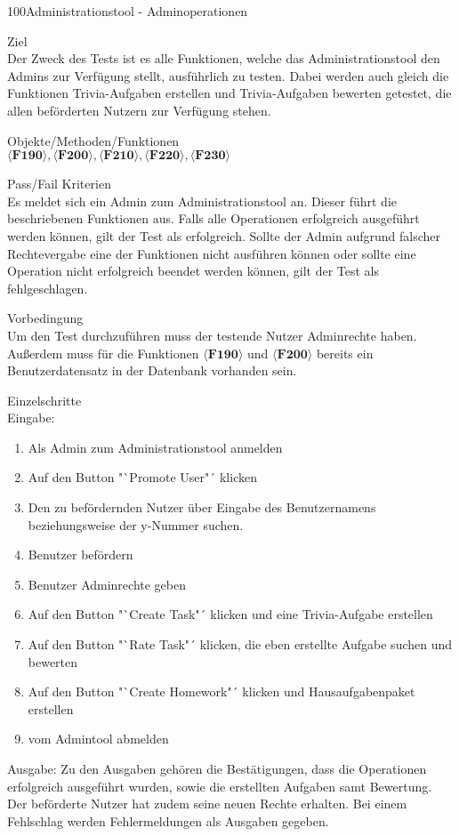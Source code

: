 \begin{testcase}{100}{Administrationstool - Adminoperationen}

\item[Ziel]~\\
Der Zweck des Tests ist es alle Funktionen, welche das Administrationstool den Admins zur Verfügung stellt, ausführlich zu testen. Dabei werden auch gleich die Funktionen Trivia-Aufgaben erstellen und Trivia-Aufgaben bewerten getestet, die allen beförderten Nutzern zur Verfügung stehen.

\item[Objekte/Methoden/Funktionen]~\\
$\langle\textbf{F190}\rangle, \langle\textbf{F200}\rangle, \langle\textbf{F210}\rangle, \langle\textbf{F220}\rangle, \langle\textbf{F230}\rangle$ 

\item[Pass/Fail Kriterien]~\\
Es meldet sich ein Admin zum Administrationstool an. Dieser führt die beschriebenen Funktionen aus. Falls alle Operationen erfolgreich ausgeführt werden können, gilt der Test als erfolgreich. Sollte der Admin aufgrund falscher Rechtevergabe eine der Funktionen nicht ausführen können oder sollte eine Operation nicht erfolgreich beendet werden können, gilt der Test als fehlgeschlagen.

\item[Vorbedingung]~\\
Um den Test durchzuführen muss der testende Nutzer Adminrechte haben. Außerdem muss für die Funktionen $\langle\textbf{F190}\rangle$ und $\langle\textbf{F200}\rangle$ bereits ein Benutzerdatensatz in der Datenbank vorhanden sein.

\item[Einzelschritte]~\\

Eingabe:
\begin{enumerate}
\item Als Admin zum Administrationstool anmelden
\item Auf den Button "`Promote User"´ klicken
\item Den zu befördernden Nutzer über Eingabe des Benutzernamens beziehungsweise der y-Nummer suchen.
\item Benutzer befördern
\item Benutzer Adminrechte geben
\item Auf den Button "`Create Task"´ klicken und eine Trivia-Aufgabe erstellen
\item Auf den Button "`Rate Task"´ klicken, die eben erstellte Aufgabe suchen und bewerten
\item Auf den Button "`Create Homework"´ klicken und Hausaufgabenpaket erstellen
\item vom Admintool abmelden
\end{enumerate}
Ausgabe:
Zu den Ausgaben gehören die Bestätigungen, dass die Operationen erfolgreich ausgeführt wurden, sowie die erstellten Aufgaben samt Bewertung. Der beförderte Nutzer hat zudem seine neuen Rechte erhalten. 
Bei einem Fehlschlag werden Fehlermeldungen als Ausgaben gegeben.


\end{testcase}
